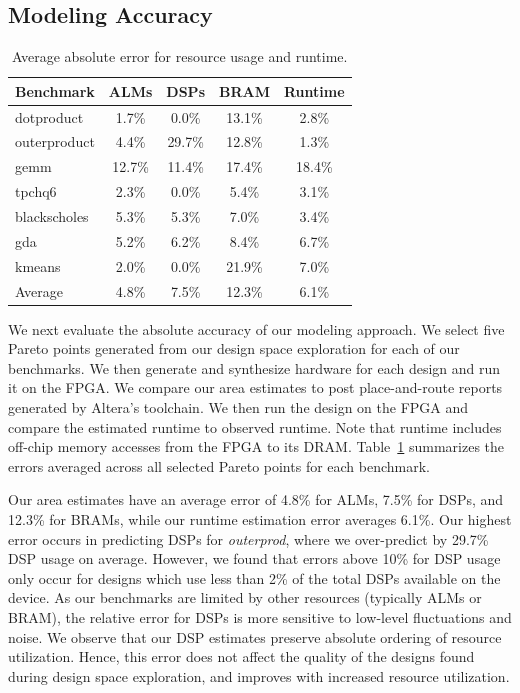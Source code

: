 \subsection{Modeling Accuracy}

\begin{table}
\centering\footnotesize
\begin{tabular}{lcccc}
\toprule

{\bf Benchmark} & {\bf ALMs} & {\bf DSPs} & {\bf BRAM} & {\bf Runtime} \\ \midrule
dotproduct      & 1.7\%      & 0.0\%      & 13.1\%      & 2.8\%  \\ \midrule
outerproduct    & 4.4\%      & 29.7\%     & 12.8\%      & 1.3\%  \\ \midrule
gemm            & 12.7\%     & 11.4\%     & 17.4\%      & 18.4\% \\ \midrule
tpchq6          & 2.3\%      & 0.0\%      & 5.4\%       & 3.1\%  \\ \midrule
blackscholes    & 5.3\%      & 5.3\%      & 7.0\%       & 3.4\%  \\ \midrule
gda             & 5.2\%      & 6.2\%      & 8.4\%       & 6.7\%  \\ \midrule
kmeans          & 2.0\%      & 0.0\%      & 21.9\%      & 7.0\%  \\ \midrule \midrule

Average         & 4.8\%      & 7.5\%     & 12.3\%      & 6.1\%   \\ \bottomrule
\end{tabular}
\caption{Average absolute error for resource usage and runtime.}
\label{t:errors}
\end{table}

We next evaluate the absolute accuracy of our modeling approach. We select five Pareto points generated from our design space exploration for each of our benchmarks. We then generate and synthesize hardware for each design and run it on the FPGA. We compare our area estimates to post place-and-route reports generated by Altera's toolchain. We then run the design on the FPGA and compare the estimated runtime to observed runtime. Note that runtime includes off-chip memory accesses from the FPGA to its DRAM. Table~\ref{t:errors} summarizes the errors averaged across all selected Pareto points for each benchmark.

Our area estimates have an average error of 4.8\% for ALMs, 7.5\% for DSPs, and 12.3\% for BRAMs, while our runtime estimation error averages 6.1\%.
Our highest error occurs in predicting DSPs for \emph{outerprod}, where we over-predict by 29.7\% DSP usage on average.
However, we found that errors above 10\% for DSP usage only occur for designs which use less than 2\% of the total DSPs available on the device.
As our benchmarks are limited by other resources (typically ALMs or BRAM), the relative error for DSPs is more sensitive
to low-level fluctuations and noise. We observe that our DSP estimates preserve absolute ordering of resource utilization. Hence, this error does not
affect the quality of the designs found during design space exploration, and improves with increased resource utilization.

